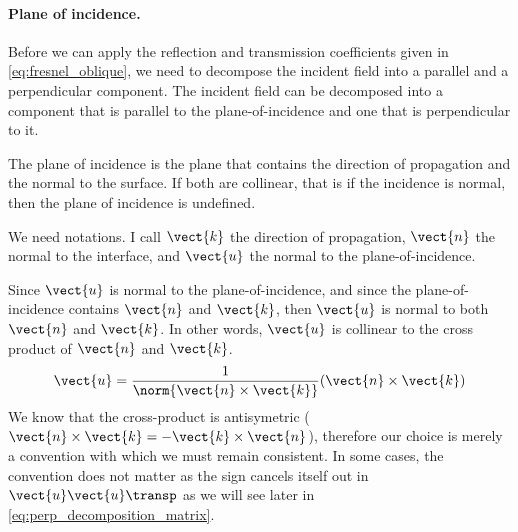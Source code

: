 \paragraph{Plane of incidence.}
Before we can apply the reflection and transmission coefficients given in \cref{eq:fresnel_oblique}, we need to decompose the incident field into a parallel and a perpendicular component.
The incident field can be decomposed into a component that is parallel to the plane-of-incidence and one that is perpendicular to it.

The plane of incidence is the plane that contains the direction of propagation and the normal to the surface.
If both are collinear, that is if the incidence is normal, then the plane of incidence is undefined.

We need notations.
I call $\vect{k}$ the direction of propagation, $\vect{n}$ the normal to the interface, and $\vect{u}$ the normal to the plane-of-incidence.

Since $\vect{u}$ is normal to the plane-of-incidence, and since the plane-of-incidence contains $\vect{n}$ and $\vect{k}$, then $\vect{u}$ is normal to both $\vect{n}$ and $\vect{k}$.
In other words, $\vect{u}$ is collinear to the cross product of $\vect{n}$ and $\vect{k}$.
\begin{equation}
    \vect{u} = \frac{1}{\norm{\vect{n} \times \vect{k}}} (\vect{n} \times \vect{k})  \label{eq:normal_to_plane_of_incidence}
\end{equation}
We know that the cross-product is antisymetric
($\vect{n} \times \vect{k} = \mathord{-} \vect{k} \times \vect{n}$),
therefore our choice is merely a convention with which we must remain consistent.
In some cases, the convention does not matter as the sign cancels itself out in $\vect{u} \vect{u}\transp$ as we will see later in \cref{eq:perp_decomposition_matrix}.

